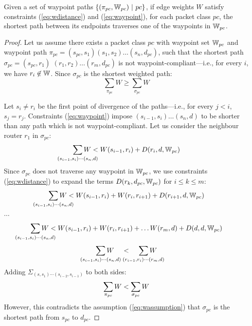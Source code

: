 \begin{theorem}[Soundness] \label{thm:waypoint}
	Given a set of waypoint paths $\{(\pi_{pc}, \mathbb{W}_{pc}) ~|~ pc\}$, if edge weights 
	$W$ satisfy constraints (\ref{eq:wdistance}) and (\ref{eq:waypoint}), for
	each packet class $pc$, the shortest path between its endpoints
	traverses one of the waypoints in $\mathbb{W}_{pc}$.
\end{theorem}
\begin{proof}
	Let us assume there exists a packet class $pc$ with waypoint set $\mathbb{W}_{pc}$ 
	and waypoint path $\pi_{pc} = (s_{pc}, s_1)(s_1, s_2)\ldots (s_n, d_{pc})$, 
	such that  the 
	shortest path $\sigma_{pc}=(s_{pc}, r_1)$ $(r_1, r_2)\ldots (r_m, d_{pc})$ 
	is not waypoint-compliant---i.e.,  
	for every $i$, we have $r_i\not\in \mathbb{W}$.	
	Since $\sigma_{pc}$ is the shortest weighted path: 
	\begin{equation} \label{eq:wassumption}
	\sum_{\pi_{pc}} W \geq \sum_{\sigma_{pc}} W
	\end{equation}

	
	Let $s_i \not= r_i$ be the first point of divergence of the paths---i.e., for every $j<i$, $s_{j} = r_{j}$.
Constraints (\ref{eq:waypoint}) impose 
$(s_{i-1}, s_i)\ldots(s_n, d)$ to be 
shorter than any path which is not waypoint-compliant. 
Let us consider the neighbour router $r_1$ in $\sigma_{pc}$:
	\[
	\sum_{\mathclap{\substack{(s_{i-1}, s_i)\cdots(s_n, d)}}} 
	W < W(s_{i-1}, r_i)+ D(r_i, d, \waypt_{pc})
	\]
	Since $\sigma_{pc}$ does not traverse any waypoint in $\mathbb{W}_{pc}$,
	we use constraints (\ref{eq:wdistance}) 
	to expand the terms $D(r_k, d_{pc}, \mathbb{W}_{pc})$ for $i \leq k \leq m$:
	\[
	\sum_{\mathclap{\substack{(s_{i-1}, s_i)\cdots(s_n, d)}}} 
	W < W(s_{i-1}, r_i)+ W(r_i, r_{i+1}) + D(r_{i+1}, d,\waypt_{pc})
	\] 
	\begin{center}
		$\ldots$
	\end{center}
	\[
	\sum_{\mathclap{\substack{(s_{i-1}, s_i)\cdots(s_n, d)}}} 
	W < W(s_{i-1}, r_i)+ W(r_i, r_{i+1}) + \ldots W(r_{m}, d) + D(d, d, \waypt_{pc})
	\] 
	\[
	\sum_{\mathclap{\substack{(s_{i-1}, s_i)\cdots(s_n, d)}}} 
	W \hspace{0.4cm}< \hspace{0.4cm}
	\sum_{\mathclap{\substack{(r_{i-1}, r_i)\cdots(r_m, d)}}} 
	W
	\]
	Adding $\Sigma_{(s, s_1)\cdots(s_{i-2},s_{i-1})}$ to both sides:
	\[
	\sum_{\mathclap{\substack{\pi_{pc}}}} 
	W < 
	\sum_{\mathclap{\substack{\sigma_{pc}}}} 
	W
	\] 
However, this contradicts the assumption (\ref{eq:wassumption}) that 
$\sigma_{pc}$ is the shortest path from $s_{pc}$ to $d_{pc}$. 
\end{proof}
